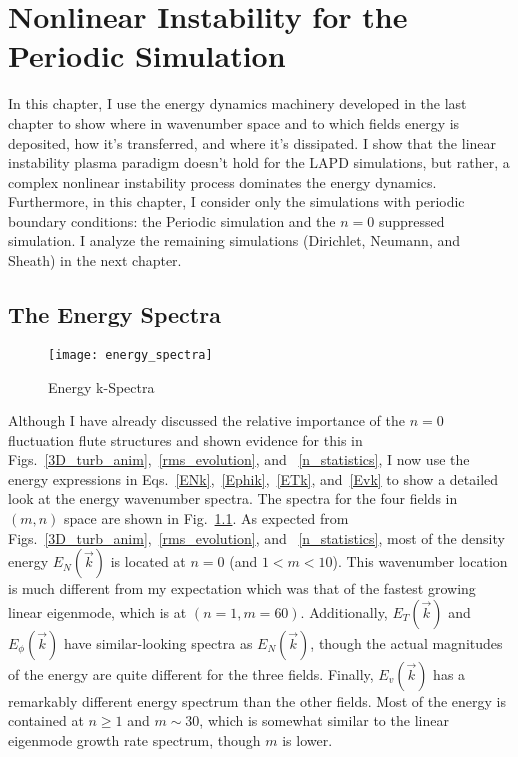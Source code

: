 \chapter{Nonlinear Instability for the Periodic Simulation}
\label{c_nlin_periodic}

In this chapter, I use the energy dynamics machinery developed in the last chapter to show where in wavenumber space and to which fields energy is deposited, how it's transferred,
and where it's dissipated. I show that the linear instability plasma paradigm doesn't hold for the LAPD simulations, but rather, a complex nonlinear instability process dominates
the energy dynamics.
Furthermore, in this chapter, I consider only the simulations with periodic boundary conditions: the Periodic simulation and the $n=0$ suppressed simulation. I analyze the remaining simulations
(Dirichlet, Neumann, and Sheath) in the next chapter.


\section{The Energy Spectra}
\label{s_en_spec}

\begin{figure}[!ht]
\centerline{\texttt{[image: energy\_spectra]}}
\caption{Energy k-Spectra}
\label{energy_spectra}
\end{figure}

Although I have already discussed the relative importance of the $n=0$ fluctuation flute structures and shown evidence for this in Figs.~\ref{3D_turb_anim},~\ref{rms_evolution}, and
~\ref{n_statistics}, I now use the energy expressions in Eqs.~\ref{ENk},~\ref{Ephik},~\ref{ETk}, and~\ref{Evk} to show a detailed look at the energy
wavenumber spectra. The spectra for the four fields in $(m,n)$ space are shown in Fig.~\ref{energy_spectra}. As expected from Figs.~\ref{3D_turb_anim},~\ref{rms_evolution}, and
~\ref{n_statistics}, most of the density energy $E_N(\vec{k})$ is located at $n=0$ (and $1 < m < 10$). This wavenumber location is much different from my expectation which was
that of the fastest growing linear eigenmode, which is at $(n = 1, m = 60)$. Additionally, $E_T(\vec{k})$ and $E_\phi(\vec{k})$ have similar-looking spectra as $E_N(\vec{k})$, though
the actual magnitudes of the energy are quite different for the three fields. Finally, $E_v(\vec{k})$ has a remarkably different energy spectrum than the other fields. Most of
the energy is contained at $n \ge 1$ and $m \sim 30$, which is somewhat similar to the linear eigenmode growth rate spectrum, though $m$ is lower.

